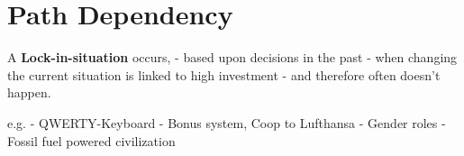 \hypertarget{path-dependency}{%
\section{Path Dependency}\label{path-dependency}}

A \textbf{Lock-in-situation} occurs, - based upon decisions in the past
- when changing the current situation is linked to high investment - and
therefore often doesn't happen.

e.g. - QWERTY-Keyboard - Bonus system, Coop to Lufthansa - Gender roles
- Fossil fuel powered civilization
